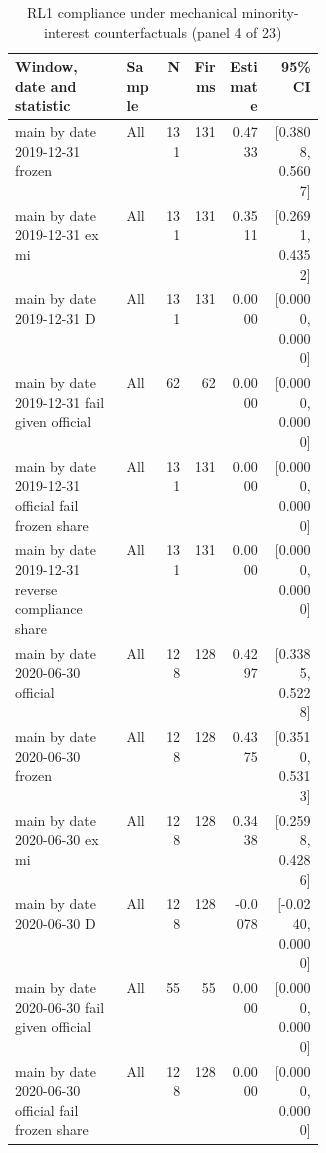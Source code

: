 \begin{table}[!htbp]\centering\scriptsize
\caption{RL1 compliance under mechanical minority-interest counterfactuals (panel 4 of 23)}
\begin{threeparttable}
\begin{tabular}{p{0.36\linewidth}lrrrr}
\toprule
Window, date and statistic & Sample & N & Firms & Estimate & 95\% CI \\
\midrule
main by date 2019-12-31 frozen & All & 131 & 131 & 0.4733 & [0.3808, 0.5607] \\
main by date 2019-12-31 ex mi & All & 131 & 131 & 0.3511 & [0.2691, 0.4352] \\
main by date 2019-12-31 D & All & 131 & 131 & 0.0000 & [0.0000, 0.0000] \\
main by date 2019-12-31 fail given official & All & 62 & 62 & 0.0000 & [0.0000, 0.0000] \\
main by date 2019-12-31 official fail frozen share & All & 131 & 131 & 0.0000 & [0.0000, 0.0000] \\
main by date 2019-12-31 reverse compliance share & All & 131 & 131 & 0.0000 & [0.0000, 0.0000] \\
main by date 2020-06-30 official & All & 128 & 128 & 0.4297 & [0.3385, 0.5228] \\
main by date 2020-06-30 frozen & All & 128 & 128 & 0.4375 & [0.3510, 0.5313] \\
main by date 2020-06-30 ex mi & All & 128 & 128 & 0.3438 & [0.2598, 0.4286] \\
main by date 2020-06-30 D & All & 128 & 128 & -0.0078 & [-0.0240, 0.0000] \\
main by date 2020-06-30 fail given official & All & 55 & 55 & 0.0000 & [0.0000, 0.0000] \\
main by date 2020-06-30 official fail frozen share & All & 128 & 128 & 0.0000 & [0.0000, 0.0000] \\
\bottomrule
\end{tabular}
\begin{tablenotes}[flushleft]\footnotesize

\end{tablenotes}
\end{threeparttable}
\end{table}
